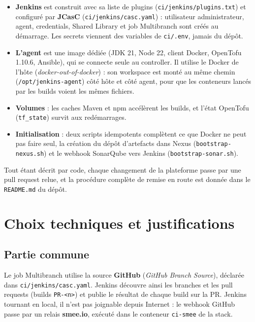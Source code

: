 \documentclass[11pt,a4paper]{report}
\begin{document}
\begin{itemize}
  \item \textbf{Jenkins} est construit avec sa liste de plugins (\texttt{ci/jenkins/plugins.txt}) et configuré par \textbf{JCasC} (\texttt{ci/jenkins/casc.yaml}) : utilisateur administrateur, agent, credentials, Shared Library et job Multibranch sont créés au démarrage. Les secrets viennent des variables de \texttt{ci/.env}, jamais du dépôt.
  \item \textbf{L'agent} est une image dédiée (JDK 21, Node 22, client Docker, OpenTofu 1.10.6, Ansible), qui se connecte seule au controller. Il utilise le Docker de l'hôte (\emph{docker-out-of-docker}) : son workspace est monté au même chemin (\texttt{/opt/jenkins-agent}) côté hôte et côté agent, pour que les conteneurs lancés par les builds voient les mêmes fichiers.
  \item \textbf{Volumes} : les caches Maven et npm accélèrent les builds, et l'état OpenTofu (\texttt{tf\_state}) survit aux redémarrages.
  \item \textbf{Initialisation} : deux scripts idempotents complètent ce que Docker ne peut pas faire seul, la création du dépôt d'artefacts dans Nexus (\texttt{bootstrap-nexus.sh}) et le webhook SonarQube vers Jenkins (\texttt{bootstrap-sonar.sh}).
\end{itemize}

Tout étant décrit par code, chaque changement de la plateforme passe par une pull request relue, et la procédure complète de remise en route est donnée dans le \texttt{README.md} du dépôt.

\chapter{Choix techniques et justifications}\label{chap:choix}

\section{Partie commune}
Le job Multibranch utilise la source \textbf{GitHub} (\emph{GitHub Branch Source}), déclarée dans \texttt{ci/jenkins/casc.yaml}. Jenkins découvre ainsi les branches et les pull requests (builds \texttt{PR-<n>}) et publie le résultat de chaque build sur la PR. Jenkins tournant en local, il n'est pas joignable depuis Internet : le webhook GitHub passe par un relais \textbf{smee.io}, exécuté dans le conteneur \texttt{ci-smee} de la stack.
\end{document}
